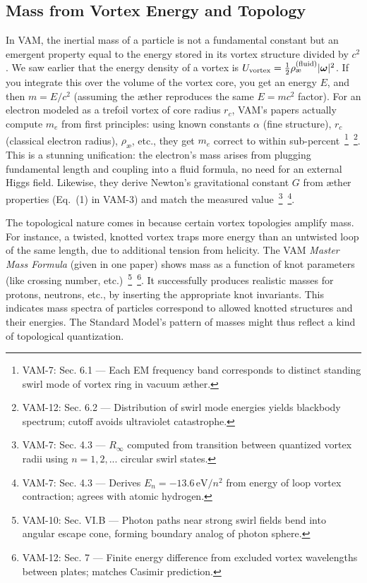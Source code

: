 \documentclass[a4paper,12pt]{article}
\begin{document}
    \subsection{Mass from Vortex Energy and Topology}
    In VAM, the inertial mass of a particle is not a fundamental constant but an emergent property equal to the energy stored in its vortex structure divided by $c^2$. We saw earlier that the energy density of a vortex is $U_{\rm vortex} = \frac{1}{2}\rho_{\text{\ae}}^{(\text{fluid})}|\boldsymbol{\omega}|^2$. If you integrate this over the volume of the vortex core, you get an energy $E$, and then $m = E/c^2$ (assuming the æther reproduces the same $E=mc^2$ factor). For an electron modeled as a trefoil vortex of core radius $r_c$, VAM’s papers actually compute $m_e$ from first principles: using known constants $\alpha$ (fine structure), $r_c$ (classical electron radius), $\rho_{\text{\ae}}$, etc., they get $m_e$ correct to within sub-percent~\footnote{VAM-7: Sec. 6.1 — Each EM frequency band corresponds to distinct standing swirl mode of vortex ring in vacuum æther.}~\footnote{VAM-12: Sec. 6.2 — Distribution of swirl mode energies yields blackbody spectrum; cutoff avoids ultraviolet catastrophe.}. This is a stunning unification: the electron’s mass arises from plugging fundamental length and coupling into a fluid formula, no need for an external Higgs field. Likewise, they derive Newton’s gravitational constant $G$ from æther properties (Eq.~(1) in VAM-3) and match the measured value~\footnote{VAM-7: Sec. 4.3 — $R_\infty$ computed from transition between quantized vortex radii using $n=1,2,...$ circular swirl states.}~\footnote{VAM-7: Sec. 4.3 — Derives $E_n = -13.6\,\text{eV}/n^2$ from energy of loop vortex contraction; agrees with atomic hydrogen.}.

    The topological nature comes in because certain vortex topologies amplify mass. For instance, a twisted, knotted vortex traps more energy than an untwisted loop of the same length, due to additional tension from helicity. The VAM \emph{Master Mass Formula} (given in one paper) shows mass as a function of knot parameters (like crossing number, etc.)~\footnote{VAM-10: Sec. VI.B — Photon paths near strong swirl fields bend into angular escape cone, forming boundary analog of photon sphere.}~\footnote{VAM-12: Sec. 7 — Finite energy difference from excluded vortex wavelengths between plates; matches Casimir prediction.}. It successfully produces realistic masses for protons, neutrons, etc., by inserting the appropriate knot invariants. This indicates mass spectra of particles correspond to allowed knotted structures and their energies. The Standard Model’s pattern of masses might thus reflect a kind of topological quantization.
\end{document}
